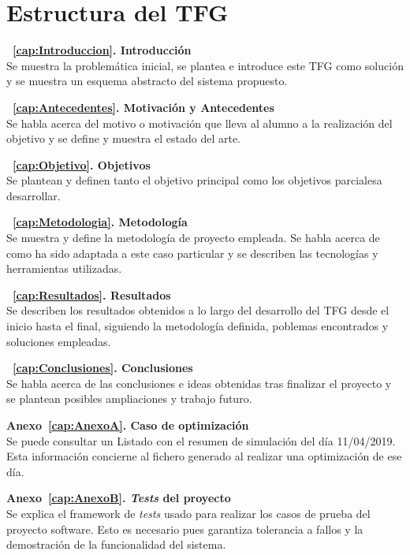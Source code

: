 \section{Estructura del TFG}
\begin{description}
\item \textbf{~\ref{cap:Introduccion}. Introducción}\\
  Se muestra la problemática inicial, se plantea e introduce este \gls{TFG} como solución y se muestra un esquema abstracto del sistema propuesto.
\item \textbf{~\ref{cap:Antecedentes}. Motivación y Antecedentes}\\
  Se habla acerca del motivo o motivación que lleva al alumno a la realización del objetivo y se define y muestra el estado del arte.
\item \textbf{~\ref{cap:Objetivo}. Objetivos}\\
  Se plantean y definen tanto el objetivo principal como los objetivos parcialesa desarrollar.
\item \textbf{~\ref{cap:Metodologia}. Metodología}\\
  Se muestra y define la metodología de proyecto empleada. Se habla acerca de como ha sido adaptada a este caso particular y se describen las tecnologías y herramientas utilizadas.
\item \textbf{~\ref{cap:Resultados}. Resultados}\\
  Se describen los resultados obtenidos a lo largo del desarrollo del \gls{TFG} desde el inicio hasta el final, siguiendo la metodología definida, poblemas encontrados y soluciones empleadas.
\item \textbf{~\ref{cap:Conclusiones}. Conclusiones}\\
  Se habla acerca de las conclusiones e ideas obtenidas tras finalizar el proyecto y se plantean posibles ampliaciones y trabajo futuro.
\item \textbf{Anexo~\ref{cap:AnexoA}. Caso de optimización}\\
  Se puede consultar un Listado con el resumen de simulación del día 11/04/2019. Esta información concierne al fichero generado al realizar una optimización de ese día.
\item \textbf{Anexo~\ref{cap:AnexoB}. \textit{Tests} del proyecto}\\
  Se explica el framework de \textit{tests} usado para realizar los casos de prueba del proyecto software. Esto es necesario pues garantiza tolerancia a fallos y la demostración de la funcionalidad del sistema.
\end{description}
